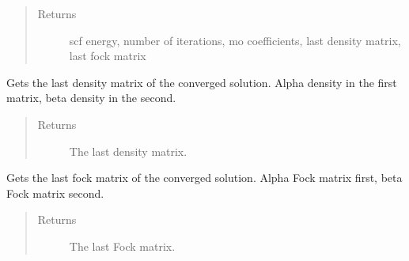 \documentclass[letterpaper,10pt,english]{sphinxmanual}
\begin{document}
\begin{fulllineitems}
\begin{fulllineitems}
\begin{quote}
\begin{description}
\begin{itemize}
\end{itemize}

\item[{Returns}] \leavevmode
scf energy, number of iterations, mo coefficients, last density matrix, last fock matrix

\end{description}\end{quote}

\end{fulllineitems}


\begin{fulllineitems}
\label{\detokenize{cUHF_b:hf.cUHF_b.CUHF.get_last_dens}}
Gets the last density matrix of the converged solution.
Alpha density in the first matrix, beta density in the second.
\begin{quote}\begin{description}
\item[{Returns}] \leavevmode
The last density matrix.

\end{description}\end{quote}

\end{fulllineitems}


\begin{fulllineitems}
\label{\detokenize{cUHF_b:hf.cUHF_b.CUHF.get_last_fock}}
Gets the last fock matrix of the converged solution.
Alpha Fock matrix first, beta Fock matrix second.
\begin{quote}\begin{description}
\item[{Returns}] \leavevmode
The last Fock matrix.

\end{description}\end{quote}

\end{fulllineitems}



\end{fulllineitems}
\end{document}
